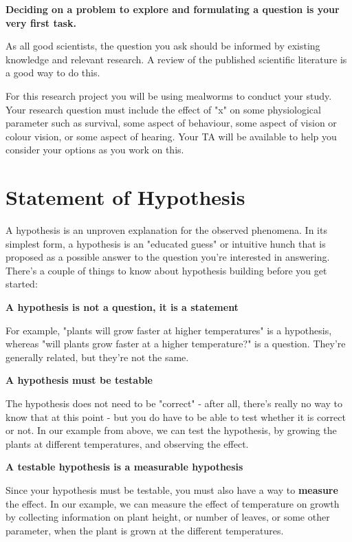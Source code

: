 \documentclass[
]{book}
\begin{document}
\textbf{Deciding on a problem to explore and formulating a question is your very first task.}

As all good scientists, the question you ask should be informed by existing knowledge and relevant research. A review of the published scientific literature is a good way to do this.

For this research project you will be using mealworms to conduct your study. Your research question must include the effect of "x" on some physiological parameter such as survival, some aspect of behaviour, some aspect of vision or colour vision, or some aspect of hearing. Your TA will be available to help you consider your options as you work on this.

\hypertarget{statement-of-hypothesis}{%
\section*{Statement of Hypothesis}\label{statement-of-hypothesis}}

A hypothesis is an unproven explanation for the observed phenomena. In its simplest form, a hypothesis is an "educated guess" or intuitive hunch that is proposed as a possible answer to the question you're interested in answering. There's a couple of things to know about hypothesis building before you get started:

\textbf{A hypothesis is not a question, it is a statement}

For example, "plants will grow faster at higher temperatures" is a hypothesis, whereas "will plants grow faster at a higher temperature?" is a question. They're generally related, but they're not the same.

\textbf{A hypothesis must be testable}

The hypothesis does not need to be "correct" - after all, there's really no way to know that at this point - but you do have to be able to test whether it is correct or not. In our example from above, we can test the hypothesis, by growing the plants at different temperatures, and observing the effect.

\textbf{A testable hypothesis is a measurable hypothesis}

Since your hypothesis must be testable, you must also have a way to \textbf{measure} the effect. In our example, we can measure the effect of temperature on growth by collecting information on plant height, or number of leaves, or some other parameter, when the plant is grown at the different temperatures.
\end{document}
